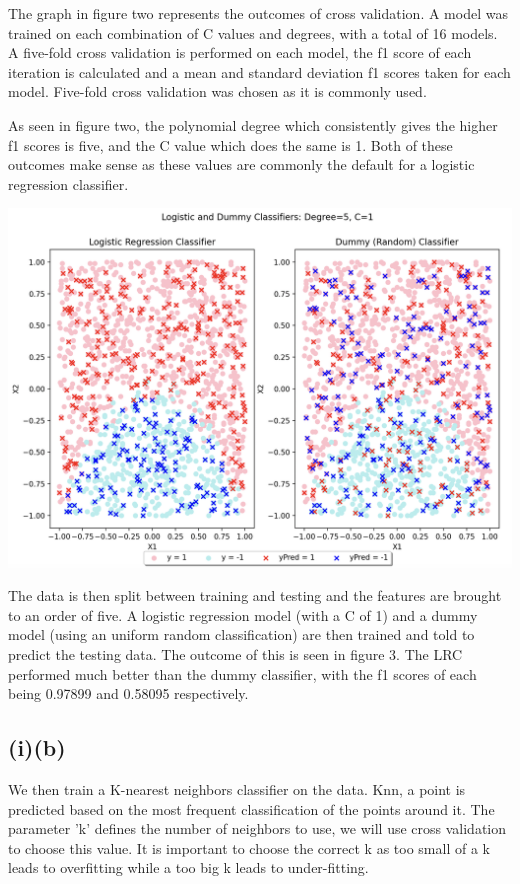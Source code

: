 \documentclass{article}
\begin{document}
The graph in figure two represents the outcomes of cross validation. A model was trained on each combination of C values and degrees, with a total of 16 models. A five-fold cross validation is performed on each model, the f1 score of each iteration is calculated and a mean and standard deviation f1 scores taken for each model. Five-fold cross validation was chosen as it is commonly used. 

As seen in figure two, the polynomial degree which consistently gives the higher f1 scores is five, and the C value which does the same is 1. Both of these outcomes make sense as these values are commonly the default for a logistic regression classifier.

\begin{center}
\includegraphics[width=\linewidth]{logreg.png}
\end{center}

The data is then split between training and testing and the features are brought to an order of five. A logistic regression model (with a C of 1) and a dummy model (using an uniform random classification) are then trained and told to predict the testing data. The outcome of this is seen in figure 3. The LRC performed much better than the dummy classifier, with the f1 scores of each being 0.97899 and 0.58095 respectively.

\subsection{(i)(b)}
We then train a K-nearest neighbors classifier on the data. Knn, a point is predicted based on the most frequent classification of the points around it. The parameter 'k' defines the number of neighbors to use, we will use cross validation to choose this value. It is important to choose the correct k as too small of a k leads to overfitting while a too big k leads to under-fitting. 
\end{document}
